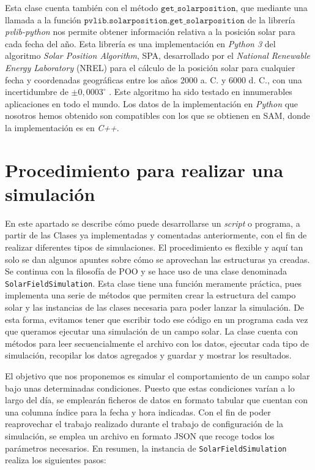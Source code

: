 Esta clase cuenta también con el  método $\texttt{get\_solarposition}$, que mediante una llamada a la función $\texttt{pvlib.solarposition.get\_solarposition}$ de la librería \emph{pvlib-python} nos permite obtener información relativa a la posición solar para cada fecha del año. Esta librería es una implementación en \emph{Python 3} del algoritmo  \emph{Solar Position Algorithm}, SPA,  desarrollado por el \emph{National Renewable Energy Laboratory} (NREL) para el cálculo de la posición solar para cualquier fecha y coordenadas geográficas entre los años 2000 a. C. y 6000 d. C., con una incertidumbre de $\pm 0,0003^\circ$ \cite{redaSolarPositionAlgorithm2008}. Este algoritmo ha sido testado en innumerables aplicaciones en todo el mundo. Los datos de la implementación en \emph{Python} que nosotros hemos obtenido son compatibles con los que se obtienen en SAM,  donde la implementación es en \emph{C++}.


\section{Procedimiento para realizar una simulación}

En este apartado se describe cómo puede desarrollarse un \emph{script} o programa, a partir de las Clases ya implementadas y comentadas anteriormente, con el fin de realizar diferentes tipos de simulaciones. El procedimiento es flexible y aquí tan solo se dan algunos apuntes sobre cómo se aprovechan las estructuras ya creadas. Se continua con la filosofía de POO y se hace uso de una clase denominada \texttt{SolarFieldSimulation}. Esta clase tiene una función meramente práctica, pues implementa una serie de métodos que permiten crear la estructura del campo solar y las instancias de las clases necesaria para poder lanzar la simulación. De esta forma, evitamos tener que escribir todo ese código en un programa cada vez que queramos ejecutar una simulación de un campo solar. La clase cuenta con métodos para leer secuencialmente el archivo con los datos, ejecutar cada tipo de simulación, recopilar los datos agregados y guardar y mostrar los resultados.

El objetivo que nos proponemos es simular el comportamiento de un campo solar bajo unas determinadas condiciones. Puesto que estas condiciones varían a lo largo del día, se emplearán ficheros de datos en formato tabular que cuentan con una columna índice para la fecha y hora indicadas. Con el fin de poder reaprovechar el trabajo realizado durante el trabajo de configuración de la simulación, se emplea un archivo en formato JSON que recoge todos los parámetros necesarios. En resumen, la instancia de \texttt{SolarFieldSimulation} realiza los siguientes pasos:

